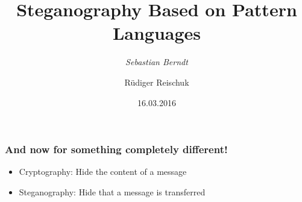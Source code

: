 \documentclass[german,table]{beamer}
\title{Steganography Based on Pattern Languages}
\author{\emph{Sebastian Berndt} \and Rüdiger Reischuk}
\institute{Institut für Theoretische Informatik,
  Universität zu Lübeck}
\date{16.03.2016}
\date{}
\begin{document}
\maketitle

\begin{frame}
  \frametitle{And now for something completely different!}

  \begin{itemize}[<+->]
  \item Cryptography: Hide the content of a message\medskip
  \item Steganography: Hide that a message is transferred
  \end{itemize}
\end{frame}

\begin{frame}


\end{frame}
\end{document}
